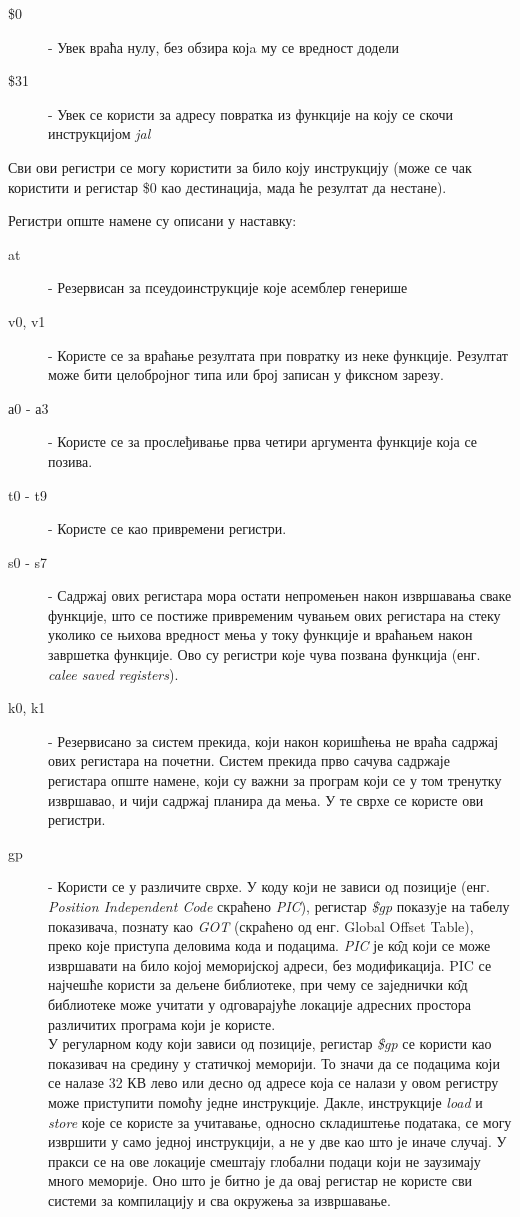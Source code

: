 \documentclass[12pt,oneside]{memoir}
\begin{document}
\begin{description}
  \item[\$0] - Увек враћа нулу, без обзира којa му се вредност додели
  \item [\$31] - Увек се користи за адресу повратка из функције на коју се скочи инструкцијом \textit{jal}
\end{description}
Сви ови регистри се могу користити за било коју инструкцију (може се чак користити и регистар \$0 као дестинација, мада ће резултат да нестане). 

Регистри опште намене су описани у наставку:
\begin{description}
  \item[at] - Резервисан за псеудоинструкције које асемблер генерише
  \item[v0, v1] - Користе се за враћање резултата при повратку из неке функције. Резултат може бити целобројног типа или број записан у фиксном зарезу.
  \item[а0 - а3] - Користе се за прослеђивање прва четири аргумента функције која се позива.
  \item[t0 - t9] - Користе се као привремени регистри. 
  \item[s0 - s7] - Садржај ових регистара мора остати непромењен након извршавања сваке функције, што се постиже привременим чувањем ових регистара на стеку уколико се њихова вредност мења у току функције и враћањем након завршетка функције. Ово су регистри које чува позвана функција (енг. \textit{calee saved registers}).
  \item[k0, k1] - Резервисано за систем прекида, који након коришћења не враћа садржај ових регистара на почетни. Систем прекида прво сачува садржаје регистара опште намене, који су важни за програм који се у том тренутку извршавао, и чији садржај планира да мења. У те сврхе се користе ови регистри.
  \item[gp] - Користи се у различите сврхе. У коду коjи не зависи од позициjе (енг. \textit{Position Independent Code} скраћено \textit{PIC}), регистар \textit{\$gp} показуjе на табелу показивача, познату као \textit{GOT} (скраћено од енг. Global Offset Table), преко које приступа деловима кода и подацима. \textit{PIC} је к\^{о}д који се може извршавати на било којој меморијској адреси, без модификација. PIC се најчешће користи за дељене библиотеке, при чему се заједнички к\^{о}д библиотеке може учитати у одговарајуће локације адресних простора различитих програма који је користе. \\
  У регуларном коду који зависи од позиције, регистар \textit{\$gp} се користи као показивач на средину у статичкој меморији. То значи да се подацима који се налазе 32 КВ лево или десно од адресе која се налази у овом регистру може приступити помоћу једне инструкције. Дакле, инструкције \textit{load} и \textit{store} које се користе за учитавање, односно складиштење података, се могу извршити у само једној инструкцији, а не у две као што је иначе случај. У пракси се на ове локације смештају глобални подаци који не заузимају много меморије. Оно што је битно је да овај регистар не користе сви системи за компилацију и сва окружења за извршавање.

\end{description}
\end{document}
